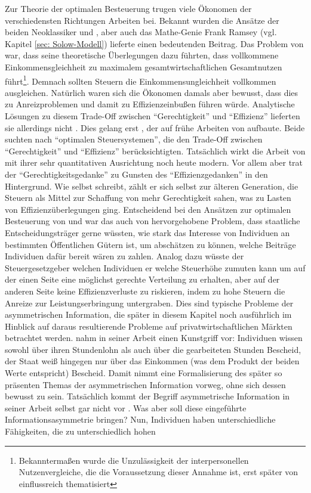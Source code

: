 Zur Theorie der optimalen Besteuerung trugen viele Ökonomen der verschiedensten Richtungen Arbeiten bei. Bekannt wurden die Ansätze der beiden Neoklassiker \textcite{Edgeworth1897} und \textcite{Pigou1920}, aber auch das Mathe-Genie Frank Ramsey (vgl. Kapitel \ref{sec: Solow-Modell}) lieferte einen bedeutenden Beitrag. Das Problem von \textcite{Pigou1920} war, dass seine theoretische Überlegungen dazu führten, dass vollkommene Einkommensgleichheit zu maximalem gesamtwirtschaftlichen Gesamtnutzen führt\footnote{Bekanntermaßen wurde die Unzulässigkeit der interpersonellen Nutzenvergleiche, die die Voraussetzung dieser Annahme ist, erst später von \textcite{Robbins1932} einflussreich thematisiert}. Demnach sollten Steuern die Einkommensungleichheit vollkommen ausgleichen. Natürlich waren sich die Ökonomen damals aber bewusst, dass dies zu Anreizproblemen und damit zu Effizienzeinbußen führen würde. Analytische Lösungen zu diesem Trade-Off zwischen "`Gerechtigkeit"' und "`Effizienz"' lieferten sie allerdings nicht \parencite[S. 168]{Sandmo1999}. Dies gelang erst \textcite{Mirrlees1971}, der auf frühe Arbeiten von \textcite{Vickrey1945, Vickrey1947} aufbaute. Beide suchten nach "`optimalen Steuersystemen"', die den Trade-Off zwischen "`Gerechtigkeit"' und "`Effizienz"' berücksichtigten. Tatsächlich wirkt die Arbeit von \textcite{Mirrlees1971} mit ihrer sehr quantitativen Ausrichtung noch heute modern. Vor allem aber trat der "`Gerechtigkeitsgedanke"' zu Gunsten des "`Effizienzgedanken"' in den Hintergrund. Wie \textcite[S. 35]{Musgrave1981} selbst schreibt, zählt er sich selbst zur älteren Generation, die Steuern als Mittel zur Schaffung von mehr Gerechtigkeit sahen, was zu Lasten von Effizienzüberlegungen ging. Entscheidend bei den Ansätzen zur optimalen Besteuerung von \textcite{Vickrey1947} und \textcite{Mirrlees1971} war das auch von \textcite{Samuelson1954} hervorgehobene Problem, dass staatliche Entscheidungsträger gerne wüssten, wie stark das Interesse von Individuen an bestimmten Öffentlichen Gütern ist, um abschätzen zu können, welche Beiträge Individuen dafür bereit wären zu zahlen. Analog dazu wüsste der Steuergesetzgeber welchen Individuen er welche Steuerhöhe zumuten kann um auf der einen Seite eine möglichst gerechte Verteilung zu erhalten, aber auf der anderen Seite keine Effizienzverluste zu riskieren, indem zu hohe Steuern die Anreize zur Leistungserbringung untergraben. Dies sind typische Probleme der asymmetrischen Information, die später in diesem Kapitel noch ausführlich im Hinblick auf daraus resultierende Probleme auf privatwirtschaftlichen Märkten betrachtet werden. \textcite{Mirrlees1971} nahm in seiner Arbeit einen Kunstgriff vor: Individuen wissen sowohl über ihren Stundenlohn als auch über die gearbeiteten Stunden Bescheid, der Staat weiß hingegen nur über das Einkommen (was dem Produkt der beiden Werte entspricht) Bescheid. Damit nimmt \textcite{Mirrlees1971} eine Formalisierung des später so präsenten Themas der asymmetrischen Information vorweg, ohne sich dessen bewusst zu sein. Tatsächlich kommt der Begriff asymmetrische Information in seiner Arbeit selbst gar nicht vor \parencite[S. 170]{Sandmo1999}. Was aber soll diese eingeführte Informationsasymmetrie bringen? Nun, Individuen haben unterschiedliche Fähigkeiten, die zu unterschiedlich hohen 